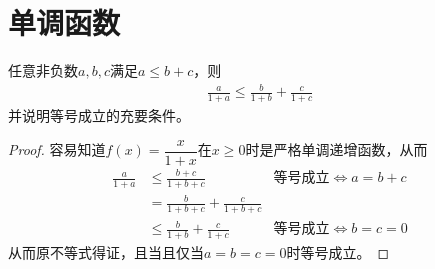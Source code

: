 
\section{单调函数}
\label{sec:monotonic-functions}

\begin{example}
  任意非负数$a,b,c$满足$a\le b+c$，则
  \begin{align*}
    \frac{a}{1+a}\le \frac{b}{1+b} + \frac{c}{1+c}
  \end{align*}
  并说明等号成立的充要条件。
\end{example}

\begin{proof}
  容易知道$f(x)=\dfrac{x}{1+x}$在$x\ge0$时是严格单调递增函数，从而
  \begin{align*}
    \frac{a}{1+a}&\le\frac{b+c}{1+b+c}&\text{等号成立}\iff a=b+c\\
    &=\frac{b}{1+b+c} + \frac{c}{1+b+c}\\
    &\le\frac{b}{1+b} + \frac{c}{1+c}&\text{等号成立}\iff b=c=0
  \end{align*}
  从而原不等式得证，且当且仅当$a=b=c=0$时等号成立。
\end{proof}